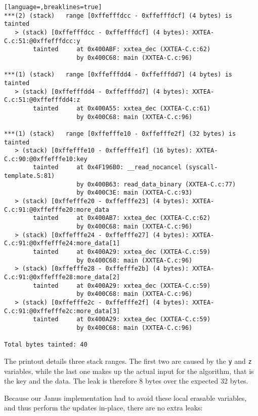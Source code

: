 \documentclass[a4paper,10pt,openright]{memoir}
\newcommand{\code}[1]{\texttt{#1}}
\begin{document}
\begin{lstlisting}[language=,breaklines=true]
***(2) (stack)	 range [0xffefffdcc - 0xffefffdcf] (4 bytes) is tainted
   > (stack) [0xffefffdcc - 0xffefffdcf] (4 bytes): XXTEA-C.c:51:@0xffefffdcc:y
        tainted     at 0x400ABF: xxtea_dec (XXTEA-C.c:62)
                    by 0x400C68: main (XXTEA-C.c:96)

***(1) (stack)	 range [0xffefffdd4 - 0xffefffdd7] (4 bytes) is tainted
   > (stack) [0xffefffdd4 - 0xffefffdd7] (4 bytes): XXTEA-C.c:51:@0xffefffdd4:z
        tainted     at 0x400A55: xxtea_dec (XXTEA-C.c:61)
                    by 0x400C68: main (XXTEA-C.c:96)

***(1) (stack)	 range [0xffefffe10 - 0xffefffe2f] (32 bytes) is tainted
   > (stack) [0xffefffe10 - 0xffefffe1f] (16 bytes): XXTEA-C.c:90:@0xffefffe10:key
        tainted     at 0x4F196B0: __read_nocancel (syscall-template.S:81)
                    by 0x400B63: read_data_binary (XXTEA-C.c:77)
                    by 0x400C3E: main (XXTEA-C.c:93)
   > (stack) [0xffefffe20 - 0xffefffe23] (4 bytes): XXTEA-C.c:91:@0xffefffe20:more_data
        tainted     at 0x400AB7: xxtea_dec (XXTEA-C.c:62)
                    by 0x400C68: main (XXTEA-C.c:96)
   > (stack) [0xffefffe24 - 0xffefffe27] (4 bytes): XXTEA-C.c:91:@0xffefffe24:more_data[1]
        tainted     at 0x400A29: xxtea_dec (XXTEA-C.c:59)
                    by 0x400C68: main (XXTEA-C.c:96)
   > (stack) [0xffefffe28 - 0xffefffe2b] (4 bytes): XXTEA-C.c:91:@0xffefffe28:more_data[2]
        tainted     at 0x400A29: xxtea_dec (XXTEA-C.c:59)
                    by 0x400C68: main (XXTEA-C.c:96)
   > (stack) [0xffefffe2c - 0xffefffe2f] (4 bytes): XXTEA-C.c:91:@0xffefffe2c:more_data[3]
        tainted     at 0x400A29: xxtea_dec (XXTEA-C.c:59)
                    by 0x400C68: main (XXTEA-C.c:96)

Total bytes tainted: 40
\end{lstlisting}

The printout details three stack ranges. The first two are caused by 
the \code{y} and \code{z} variables, while the last one makes up the 
actual input for the algorithm, that is the key and the data. The leak 
is therefore 8 bytes over the expected 32 bytes.

Because our Janus implementation had to avoid these local erasable 
variables, and thus perform the updates in-place, there are no extra 
leaks:
\end{document}
